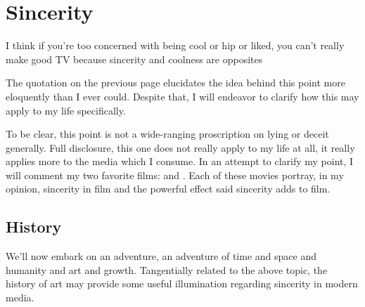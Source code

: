 \documentclass[../butidigress.tex]{subfiles}
\begin{document}
\chapter{Sincerity}\label{chap:sincerity}
\epigraph{I think if you're too concerned with being cool or hip or liked, you can't really make good TV because sincerity and coolness are opposites}{}
\newpage

The quotation on the previous page elucidates the idea behind this point more eloquently than I ever could.
Despite that, I will endeavor to clarify how this may apply to my life specifically.

To be clear, this point is not a wide-ranging proscription on lying or deceit generally.
Full disclosure, this one does not really apply to my life at all, it really applies more to the media which I consume.
In an attempt to clarify my point, I will comment my two favorite films:  and .
Each of these movies portray, in my opinion, sincerity in film and the powerful effect said sincerity adds to film.

\vspace{1em}

\section{History}
We'll now embark on an adventure, an adventure of time and space and humanity and art and growth.
Tangentially related to the above topic, the history of art may provide some useful illumination regarding sincerity in modern media.
\end{document}
